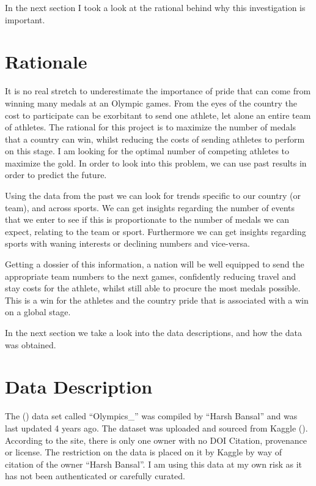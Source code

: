 \documentclass[
]{article}
\begin{document}
In the next section I took a look at the rational behind why this investigation is important.

\section*{Rationale}\label{rationale}

It is no real stretch to underestimate the importance of pride that can come from winning many medals at an Olympic games. From the eyes of the country the cost to participate can be exorbitant to send one athlete, let alone an entire team of athletes. The rational for this project is to maximize the number of medals that a country can win, whilst reducing the costs of sending athletes to perform on this stage. I am looking for the optimal number of competing athletes to maximize the gold. In order to look into this problem, we can use past results in order to predict the future.

Using the data from the past we can look for trends specific to our country (or team), and across sports. We can get insights regarding the number of events that we enter to see if this is proportionate to the number of medals we can expect, relating to the team or sport. Furthermore we can get insights regarding sports with waning interests or declining numbers and vice-versa.

Getting a dossier of this information, a nation will be well equipped to send the appropriate team numbers to the next games, confidently reducing travel and stay costs for the athlete, whilst still able to procure the most medals possible. This is a win for the athletes and the country pride that is associated with a win on a global stage.

In the next section we take a look into the data descriptions, and how the data was obtained.

\newpage

\section*{Data Description}\label{data-description}

The () data set called ``Olympics\_'' was compiled by ``Harsh Bansal'' and was last updated 4 years ago. The dataset was uploaded and sourced from Kaggle (). According to the site, there is only one owner with no DOI Citation, provenance or license. The restriction on the data is placed on it by Kaggle by way of citation of the owner ``Harsh Bansal''. I am using this data at my own risk as it has not been authenticated or carefully curated.
\end{document}
